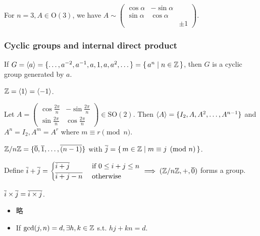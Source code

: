 For $n = 3, A \in \text{O}(3)$, we have $A \sim \begin{pmatrix}
  \cos\alpha & -\sin\alpha & \\
  \sin\alpha & \cos\alpha & \\
   & & \pm 1
\end{pmatrix}$.

\subsubsection{Cyclic groups and internal direct product}

\begin{definition}
  If $G = \langle a\rangle = \{ \dots, a^{-2}, a^{-1}, a, 1, a, a^2, \dots \}
  = \{\, a^n \mid n \in \mathbb{Z} \,\}$, then $G$ is a cyclic group generated by $a$.
\end{definition}

\begin{example}
  $\mathbb{Z} = \langle1\rangle = \langle-1\rangle$.
\end{example}

\begin{example}
  Let $A = \begin{pmatrix}
    \cos \frac{2\pi}{n} & -\sin \frac{2\pi}{n} \\ 
    \sin \frac{2\pi}{n} & \cos \frac{2\pi}{n}
  \end{pmatrix} \in \text{SO}(2)$. Then $\langle A\rangle =
  \{ I_2, A, A^2, \dots, A^{n-1} \}$ and $A^n = I_2, A^m = A^r$ where
  $m \equiv r \pmod n$.
\end{example}

\begin{example}
  ${\mathbb{Z}}/{n\mathbb{Z}} = \{ \overline{0}, \overline{1}, \dots, \overline{(n-1)} \}$ with
  $\overline{j} = \{\, m \in \mathbb{Z} \mid m \equiv j \pmod n \,\}$.

  Define $\overline{i} + \overline{j} = \begin{cases}
    \overline{i+j} & \text{~if~} 0 \le i + j \le n \\
    \overline{i+j-n} & \text{~otherwise}
  \end{cases} \implies ({\mathbb{Z}}/{n\mathbb{Z}}, +, \overline{0})$ forms a group.
\end{example}

\begin{remark}
  $\overline{i} \times \overline{j} = \overline{i \times j}$.
  \begin{itemize}
    \item 略
    \item If $\gcd(j, n) = d, \exists h, k \in \mathbb{Z}$ s.t. $hj + kn = d$.
  \end{itemize}
\end{remark}

